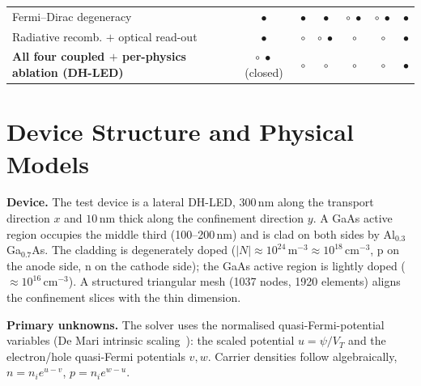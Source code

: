 \documentclass[conference]{IEEEtran}
\newcommand{\yes}{$\bullet$}
\newcommand{\part}{$\circ\!\!\!\!\;\bullet$}
\newcommand{\no}{$\circ$}
\begin{document}
\begin{table}[t]
\begin{tabular}{@{}lcccccc@{}}
Fermi--Dirac degeneracy             & \yes & \yes  & \yes  & \part & \part & \yes \\
Radiative recomb. $+$ optical read-out & \yes & \no & \part & \no & \no & \yes \\
\textbf{All four coupled $+$ per-physics ablation (DH-LED)} & \part{}(closed) & \no & \no & \no & \no & \textbf{\yes} \\
\bottomrule
\end{tabular}
\end{table}

\section{Device Structure and Physical Models}
\textbf{Device.} The test device is a lateral DH-LED, $300\,$nm along the
transport direction $x$ and $10\,$nm thick along the confinement direction $y$. A
GaAs active region occupies the middle third (100--200\,nm) and is clad on both
sides by Al$_{0.3}$Ga$_{0.7}$As. The cladding is degenerately doped
($|N|\approx10^{24}\,\text{m}^{-3}\approx10^{18}\,\text{cm}^{-3}$, p on the anode
side, n on the cathode side); the GaAs active region is lightly doped
($\approx10^{16}\,\text{cm}^{-3}$). A structured triangular mesh (1037 nodes,
1920 elements) aligns the confinement slices with the thin dimension.

\textbf{Primary unknowns.} The solver uses the normalised quasi-Fermi-potential
variables (De Mari intrinsic scaling~\cite{demari}): the scaled potential
$u=\psi/V_T$ and the electron/hole quasi-Fermi potentials $v,w$. Carrier
densities follow algebraically, $n=n_i e^{u-v}$, $p=n_i e^{w-u}$.
\end{document}
